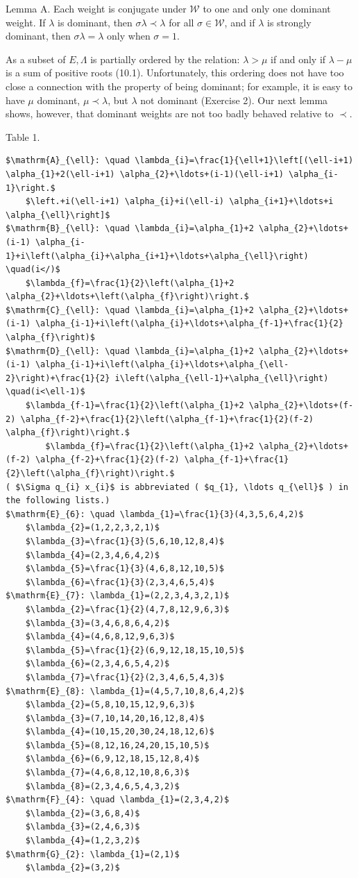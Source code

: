 \documentclass[10pt]{article}
\begin{document}
Lemma A. Each weight is conjugate under $\mathscr{W}$ to one and only one dominant weight. If $\lambda$ is dominant, then $\sigma \lambda \prec \lambda$ for all $\sigma \in \mathscr{W}$, and if $\lambda$ is strongly dominant, then $\sigma \lambda=\lambda$ only when $\sigma=1$.

As a subset of $E, \Lambda$ is partially ordered by the relation: $\lambda>\mu$ if and only if $\lambda-\mu$ is a sum of positive roots (10.1). Unfortunately, this ordering does not have too close a connection with the property of being dominant; for example, it is easy to have $\mu$ dominant, $\mu \prec \lambda$, but $\lambda$ not dominant (Exercise 2). Our next lemma shows, however, that dominant weights are not too badly behaved relative to $\prec$.

Table 1.

\begin{verbatim}
$\mathrm{A}_{\ell}: \quad \lambda_{i}=\frac{1}{\ell+1}\left[(\ell-i+1) \alpha_{1}+2(\ell-i+1) \alpha_{2}+\ldots+(i-1)(\ell-i+1) \alpha_{i-1}\right.$
    $\left.+i(\ell-i+1) \alpha_{i}+i(\ell-i) \alpha_{i+1}+\ldots+i \alpha_{\ell}\right]$
$\mathrm{B}_{\ell}: \quad \lambda_{i}=\alpha_{1}+2 \alpha_{2}+\ldots+(i-1) \alpha_{i-1}+i\left(\alpha_{i}+\alpha_{i+1}+\ldots+\alpha_{\ell}\right) \quad(i</)$
    $\lambda_{f}=\frac{1}{2}\left(\alpha_{1}+2 \alpha_{2}+\ldots+\left(\alpha_{f}\right)\right.$
$\mathrm{C}_{\ell}: \quad \lambda_{i}=\alpha_{1}+2 \alpha_{2}+\ldots+(i-1) \alpha_{i-1}+i\left(\alpha_{i}+\ldots+\alpha_{f-1}+\frac{1}{2} \alpha_{f}\right)$
$\mathrm{D}_{\ell}: \quad \lambda_{i}=\alpha_{1}+2 \alpha_{2}+\ldots+(i-1) \alpha_{i-1}+i\left(\alpha_{i}+\ldots+\alpha_{\ell-2}\right)+\frac{1}{2} i\left(\alpha_{\ell-1}+\alpha_{\ell}\right) \quad(i<\ell-1)$
    $\lambda_{f-1}=\frac{1}{2}\left(\alpha_{1}+2 \alpha_{2}+\ldots+(f-2) \alpha_{f-2}+\frac{1}{2}\left(\alpha_{f-1}+\frac{1}{2}(f-2) \alpha_{f}\right)\right.$
        $\lambda_{f}=\frac{1}{2}\left(\alpha_{1}+2 \alpha_{2}+\ldots+(f-2) \alpha_{f-2}+\frac{1}{2}(f-2) \alpha_{f-1}+\frac{1}{2}\left(\alpha_{f}\right)\right.$
( $\Sigma q_{i} x_{i}$ is abbreviated ( $q_{1}, \ldots q_{\ell}$ ) in the following lists.)
$\mathrm{E}_{6}: \quad \lambda_{1}=\frac{1}{3}(4,3,5,6,4,2)$
    $\lambda_{2}=(1,2,2,3,2,1)$
    $\lambda_{3}=\frac{1}{3}(5,6,10,12,8,4)$
    $\lambda_{4}=(2,3,4,6,4,2)$
    $\lambda_{5}=\frac{1}{3}(4,6,8,12,10,5)$
    $\lambda_{6}=\frac{1}{3}(2,3,4,6,5,4)$
$\mathrm{E}_{7}: \lambda_{1}=(2,2,3,4,3,2,1)$
    $\lambda_{2}=\frac{1}{2}(4,7,8,12,9,6,3)$
    $\lambda_{3}=(3,4,6,8,6,4,2)$
    $\lambda_{4}=(4,6,8,12,9,6,3)$
    $\lambda_{5}=\frac{1}{2}(6,9,12,18,15,10,5)$
    $\lambda_{6}=(2,3,4,6,5,4,2)$
    $\lambda_{7}=\frac{1}{2}(2,3,4,6,5,4,3)$
$\mathrm{E}_{8}: \lambda_{1}=(4,5,7,10,8,6,4,2)$
    $\lambda_{2}=(5,8,10,15,12,9,6,3)$
    $\lambda_{3}=(7,10,14,20,16,12,8,4)$
    $\lambda_{4}=(10,15,20,30,24,18,12,6)$
    $\lambda_{5}=(8,12,16,24,20,15,10,5)$
    $\lambda_{6}=(6,9,12,18,15,12,8,4)$
    $\lambda_{7}=(4,6,8,12,10,8,6,3)$
    $\lambda_{8}=(2,3,4,6,5,4,3,2)$
$\mathrm{F}_{4}: \quad \lambda_{1}=(2,3,4,2)$
    $\lambda_{2}=(3,6,8,4)$
    $\lambda_{3}=(2,4,6,3)$
    $\lambda_{4}=(1,2,3,2)$
$\mathrm{G}_{2}: \lambda_{1}=(2,1)$
    $\lambda_{2}=(3,2)$
\end{verbatim}
\end{document}
